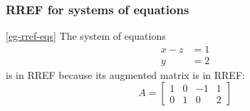 \documentclass[9pt]{beamer}
\begin{document}
\begin{frame}[t]
 \frametitle{RREF for systems of equations}
 
 \begin{example*}{\ref{eg-rref-eqs}}
  The system of equations 
  \begin{align*}
   x-z &=1 \\ y &=2
  \end{align*}
  is in RREF because its augmented matrix is in RREF:
  \[ A =
      \left[\begin{array}{ccc|c} 1&0&-1&1 \\ 0&1&0&2 \end{array}\right]
  \]
 \end{example*}
\end{frame}
\end{document}
